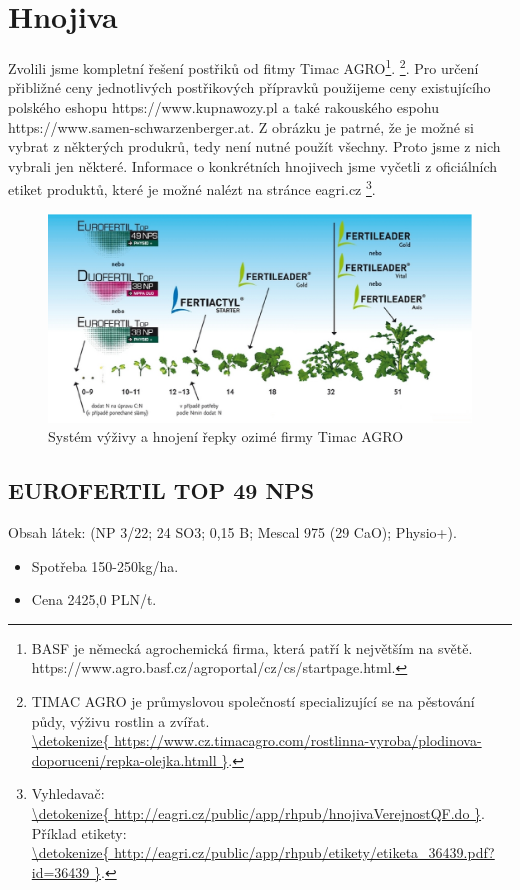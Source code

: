 
\section{Hnojiva}
Zvolili jsme kompletní řešení postřiků od fitmy Timac AGRO\footnote{BASF je německá agrochemická firma, která patří k 
největším na světě.\\https://www.agro.basf.cz/agroportal/cz/cs/startpage.html.}.
\footnote{TIMAC AGRO je průmyslovou společností specializující se na pěstování půdy, výživu rostlin a zvířat.\\\url{\detokenize{
https://www.cz.timacagro.com/rostlinna-vyroba/plodinova-doporuceni/repka-olejka.htmll
}}.}.
Pro určení přibližné ceny jednotlivých postřikových přípravků použijeme ceny existujícího polského eshopu https://www.kupnawozy.pl a také
rakouského espohu https://www.samen-schwarzenberger.at. Z obrázku je patrné, že je možné si vybrat z některých produkrů, tedy není nutné použít všechny.
Proto jsme z nich vybrali jen některé. Informace o konkrétních hnojivech jsme vyčetli z oficiálních etiket produktů,
 které je možné nalézt na stránce eagri.cz
\footnote{Vyhledavač:\\\url{\detokenize{
http://eagri.cz/public/app/rhpub/hnojivaVerejnostQF.do
}}. Příklad etikety:\\\url{\detokenize{
http://eagri.cz/public/app/rhpub/etikety/etiketa_36439.pdf?id=36439
}}.}.
\begin{figure}[ht!]
\centering
\includegraphics[width=170mm]{img/timac_hnojiva.eps}
\caption{Systém výživy a hnojení řepky ozimé firmy Timac AGRO \label{timac_hnojiva}}
\end{figure}

\subsection{EUROFERTIL TOP 49 NPS}
Obsah látek: (NP 3/22; 24 SO3; 0,15 B; Mescal 975 (29 CaO); Physio+).
\begin{itemize}
  \item Spotřeba 150-250kg/ha.
  \item Cena 2425,0 PLN/t.
\end{itemize}

